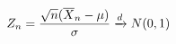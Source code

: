 \documentclass[preview]{standalone}
\begin{document}
\begin{align*}
\special{dvisvgm:raw <g id='unique000'>}Z_n=\frac{\sqrt n(\overline X_n-\mu)}{\sigma}\xrightarrow{d}N(0,1)\special{dvisvgm:raw </g>}
\end{align*}
\end{document}
